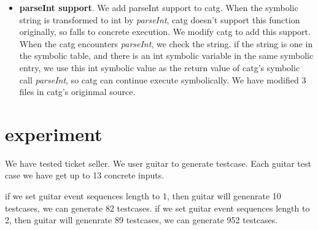 \documentclass[blind]{sig-alternate-05-2015}
\begin{document}
\begin{itemize}
    \item{\textbf{parseInt support}}. We add parseInt support to catg. When the symbolic string is transformed to int by \textit{parseInt}, catg doesn't support this function originally, so falls to concrete execution. We modify catg to add this support. When the catg encounters \textit{parseInt}, we check the string. if the string is one in the symbolic table, and there is an int symbolic variable in the same symbolic entry, we use this int symbolic value as the return value of  catg's symbolic call \textit{parseInt}, so catg can continue execute symbolically. We have modified 3 files in catg's originmal source.

\end{itemize}


\section{experiment}
We have tested ticket seller. We user guitar to generate testcase. Each guitar test case we have get up to 13 concrete inputs.

if we set guitar event sequences length to 1, then guitar will genenrate 10 testcases, we can generate 82 testcases.
if we set guitar event sequences length to 2, then guitar will genenrate 89 testcases, we can generate 952 testcases.




\end{document}
